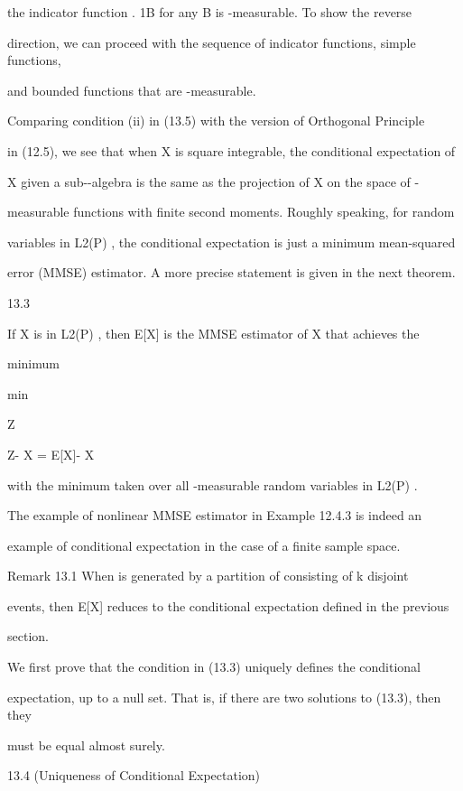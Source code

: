 the indicator function . 1B for any B\in {} is -measurable. To show the reverse

direction, we can proceed with the sequence of indicator functions, simple functions,

and bounded functions that are -measurable.

Comparing condition (ii) in (13.5) with the version of Orthogonal Principle

in (12.5), we see that when X is square integrable, the conditional expectation of

X given a sub-\sigma-algebra is the same as the projection of X on the space of -

measurable functions with finite second moments. Roughly speaking, for random

variables in L2(P) , the conditional expectation is just a minimum mean-squared

error (MMSE) estimator. A more precise statement is given in the next theorem.

\begin{thmbox}{13.3}
\end{thmbox}

If X is in L2(P) , then E[X\vert{}] is the MMSE estimator of X that achieves the

minimum

min

Z

Z- X = E[X\vert{}]- X

with the minimum taken over all -measurable random variables in L2(P) .

The example of nonlinear MMSE estimator in Example 12.4.3 is indeed an

example of conditional expectation in the case of a finite sample space.

Remark 13.1 When is generated by a partition of \Omega consisting of k disjoint

events, then E[X\vert{}] reduces to the conditional expectation defined in the previous

section.

We first prove that the condition in (13.3) uniquely defines the conditional

expectation, up to a null set. That is, if there are two solutions to (13.3), then they

must be equal almost surely.

\begin{thmbox}{13.4 (Uniqueness of Conditional Expectation)}
\end{thmbox}

